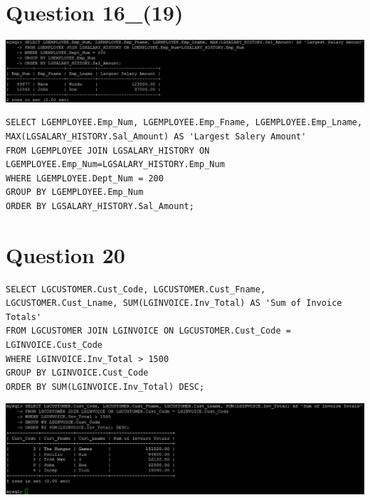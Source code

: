 \documentclass[a4paper,10pt]{article}
\begin{document}
\section*{Question 16_(19)}
\includegraphics{Queries/Question_16_(19)/Q16_screenshot.jpg}
\lstset{
            language=SQL,
            breaklines=true
            }
        \begin{lstlisting}[frame=single]
        SELECT LGEMPLOYEE.Emp_Num, LGEMPLOYEE.Emp_Fname, LGEMPLOYEE.Emp_Lname, MAX(LGSALARY_HISTORY.Sal_Amount) AS 'Largest Salery Amount'
FROM LGEMPLOYEE JOIN LGSALARY_HISTORY ON LGEMPLOYEE.Emp_Num=LGSALARY_HISTORY.Emp_Num
WHERE LGEMPLOYEE.Dept_Num = 200
GROUP BY LGEMPLOYEE.Emp_Num
ORDER BY LGSALARY_HISTORY.Sal_Amount;

        \end{lstlisting}
\section*{Question 20}
\lstset{
            language=SQL,
            breaklines=true
            }
        \begin{lstlisting}[frame=single]
        SELECT LGCUSTOMER.Cust_Code, LGCUSTOMER.Cust_Fname, LGCUSTOMER.Cust_Lname, SUM(LGINVOICE.Inv_Total) AS 'Sum of Invoice Totals'
FROM LGCUSTOMER JOIN LGINVOICE ON LGCUSTOMER.Cust_Code = LGINVOICE.Cust_Code
WHERE LGINVOICE.Inv_Total > 1500
GROUP BY LGINVOICE.Cust_Code
ORDER BY SUM(LGINVOICE.Inv_Total) DESC;

        \end{lstlisting}
\includegraphics{Queries/Question_20/Question_20_screenshot.PNG}
\end{document}
